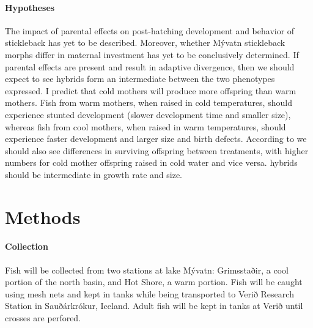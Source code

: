 \documentclass[12pt]{extarticle}
\begin{document}
\paragraph{Hypotheses}
The impact of parental effects on post-hatching development and behavior of stickleback has yet to be described. Moreover, whether M\'yvatn stickleback morphs differ in maternal investment has yet to be conclusively determined. 
If parental effects are present and result in adaptive divergence, then we should expect to see hybrids form an intermediate between the two phenotypes expressed. I predict that cold mothers will produce more offspring than warm mothers. Fish from warm mothers, when raised in cold temperatures, should experience stunted development (slower development time and smaller size), whereas fish from cool mothers, when raised in warm temperatures, should experience faster development and larger size and birth defects.
According to \citet{Senn} we should also see differences in surviving offspring between treatments, with higher numbers for cold mother offspring raised in cold water and vice versa. hybrids should be intermediate in growth rate and size.





\section*{Methods}

\paragraph{Collection}
Fish will be collected from two stations at lake M\'yvatn: Grimsstaðir, a cool portion of the north basin, and Hot Shore, a warm portion. Fish will be caught using mesh nets and kept in tanks while being transported to Verið Research Station in Sauðárkrókur, Iceland. Adult fish will be kept in tanks at Verið until crosses are perfored.
\end{document}
